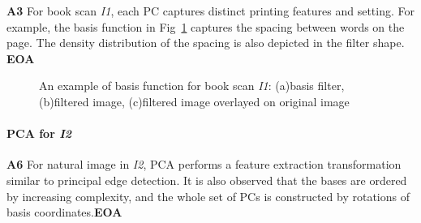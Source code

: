 \documentclass[11pt, twocolumn]{article}
\begin{document}
\vspace{-1em}
\textbf{A3} For book scan \textit{I1}, each PC captures distinct printing features and setting. For example, the basis function in Fig~\ref{fig:3} captures the spacing between words on the page. The density distribution of the spacing is also depicted in the filter shape. \textbf{EOA}
\begin{figure}[ht]
    \centering
    \caption{An example of basis function for book scan \textit{I1}: (a)basis filter, (b)filtered image, (c)filtered image overlayed on original image}
    \label{fig:3}
\end{figure}

\paragraph{PCA for \textit{I2}}

\textbf{A6} For natural image in \textit{I2}, PCA performs a feature extraction transformation similar to principal edge detection. It is also observed that the bases are ordered by increasing complexity, and the whole set of PCs is constructed by rotations of basis coordinates.\textbf{EOA}
\end{document}
